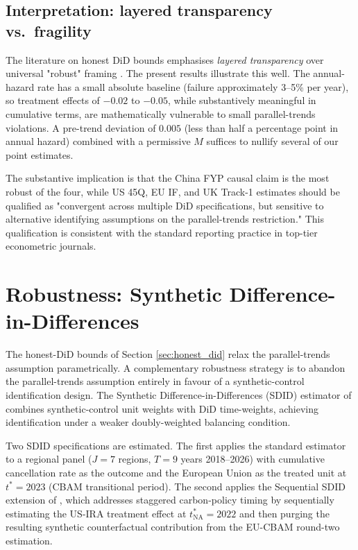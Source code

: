 \subsection{Interpretation: layered transparency vs.\ fragility}

The literature on honest DiD bounds emphasises \emph{layered transparency} over universal "robust" framing \cite{rambachan2023more,roth2022pretest}. The present results illustrate this well. The annual-hazard rate has a small absolute baseline (failure approximately 3--5\% per year), so treatment effects of $-0.02$ to $-0.05$, while substantively meaningful in cumulative terms, are mathematically vulnerable to small parallel-trends violations. A pre-trend deviation of $0.005$ (less than half a percentage point in annual hazard) combined with a permissive $M$ suffices to nullify several of our point estimates.

The substantive implication is that the China FYP causal claim is the most robust of the four, while US 45Q, EU IF, and UK Track-1 estimates should be qualified as "convergent across multiple DiD specifications, but sensitive to alternative identifying assumptions on the parallel-trends restriction." This qualification is consistent with the standard reporting practice in top-tier econometric journals.

\section{Robustness: Synthetic Difference-in-Differences}
\label{sec:results_did_sdid}

The honest-DiD bounds of Section \ref{sec:honest_did} relax the parallel-trends assumption parametrically. A complementary robustness strategy is to abandon the parallel-trends assumption entirely in favour of a synthetic-control identification design. The Synthetic Difference-in-Differences (SDID) estimator of \cite{arkhangelsky2021synthetic} combines synthetic-control unit weights with DiD time-weights, achieving identification under a weaker doubly-weighted balancing condition.

Two SDID specifications are estimated. The first applies the standard \cite{arkhangelsky2021synthetic} estimator to a regional panel ($J = 7$ regions, $T = 9$ years 2018--2026) with cumulative cancellation rate as the outcome and the European Union as the treated unit at $t^* = 2023$ (CBAM transitional period). The second applies the Sequential SDID extension of \cite{arkhangelsky2024sequential}, which addresses staggered carbon-policy timing by sequentially estimating the US-IRA treatment effect at $t^*_{\text{NA}} = 2022$ and then purging the resulting synthetic counterfactual contribution from the EU-CBAM round-two estimation.

